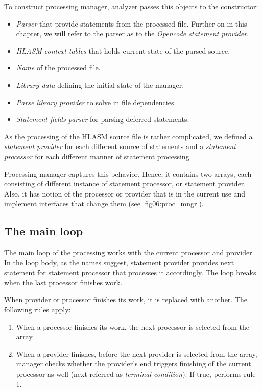 To construct processing manager, analyzer passes this objects to the constructor:
\begin{itemize}
	\item \emph{Parser} that provide statements from the processed file. Further on in this chapter, we will refer to the parser as to the \emph{Opencode statement provider}.
	\item \emph{HLASM context tables} that holds current state of the parsed source.
	\item \emph{Name} of the processed file.
	\item \emph{Library data} defining the initial state of the manager.
	\item \emph{Parse library provider} to solve in file dependencies.
	\item \emph{Statement fields parser} for parsing deferred statements. 
\end{itemize}

As the processing of the HLASM source file is rather complicated, we defined a \emph{statement provider} for each different source of statements and a \emph{statement processor} for each different manner of statement processing.

Processing manager captures this behavior. Hence, it contains two arrays, each consisting of different instance of statement processor, or statement provider.  Also, it has notion of the processor or provider that is in the current use and implement interfaces that change them (see \cref{fig06:proc_mngr}).

\subsection{The main loop}

The main loop of the processing works with the current processor and provider. In the loop body, as the names suggest, statement provider provides next statement for statement processor that processes it accordingly. The loop breaks when the last processor finishes work.

When provider or processor finishes its work, it is replaced with another. The following rules apply:

\begin{enumerate}
	\item When a processor finishes its work, the next processor is selected from the array.
	\item When a provider finishes, before the next provider is selected from the array, manager checks whether the provider's end triggers finishing of the current processor as well (next referred as \emph{terminal condition}). If true, performs rule 1.
\end{enumerate}

